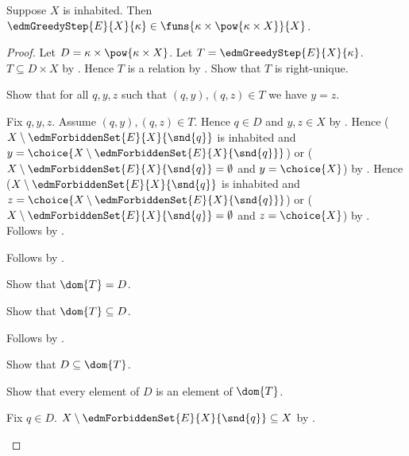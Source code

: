 \begin{theorem}\label{edm_greedy_step_type}
    Suppose $X$ is inhabited.
    Then $\edmGreedyStep{E}{X}{\kappa}
        \in\funs{\kappa\times\pow{\kappa\times X}}{X}$.
\end{theorem}
\begin{proof}
    Let $D=\kappa\times\pow{\kappa\times X}$.
    Let $T=\edmGreedyStep{E}{X}{\kappa}$.
    $T\subseteq D\times X$ by
        .
    Hence $T$ is a relation by
        .
    Show that $T$ is right-unique.
    \begin{subproof}
        Show that for all $q,y,z$ such that $(q,y),(q,z)\in T$
            we have $y=z$.
        \begin{subproof}
            Fix $q,y,z$.
            Assume $(q,y),(q,z)\in T$.
            Hence $q\in D$ and $y,z\in X$ by
                .
            Hence
                ($X\setminus\edmForbiddenSet{E}{X}{\snd{q}}$
                    is inhabited and
                    $y=\choice{X\setminus
                        \edmForbiddenSet{E}{X}{\snd{q}}}$) or
                ($X\setminus\edmForbiddenSet{E}{X}{\snd{q}}=\emptyset$ and
                    $y=\choice{X}$) by
                .
            Hence
                ($X\setminus\edmForbiddenSet{E}{X}{\snd{q}}$
                    is inhabited and
                    $z=\choice{X\setminus
                        \edmForbiddenSet{E}{X}{\snd{q}}}$) or
                ($X\setminus\edmForbiddenSet{E}{X}{\snd{q}}=\emptyset$ and
                    $z=\choice{X}$) by
                .
            Follows by .
        \end{subproof}
        Follows by .
    \end{subproof}
    Show that $\dom{T}=D$.
    \begin{subproof}
        Show that $\dom{T}\subseteq D$.
        \begin{subproof}
            Follows by .
        \end{subproof}
        Show that $D\subseteq\dom{T}$.
        \begin{subproof}
            Show that every element of $D$ is an element of $\dom{T}$.
            \begin{subproof}
                Fix $q\in D$.
                $X\setminus\edmForbiddenSet{E}{X}{\snd{q}}\subseteq X$ by
                    .

\end{subproof}
\end{subproof}
\end{subproof}
\end{proof}
